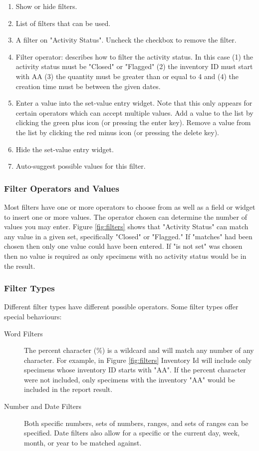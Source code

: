 \begin{enumerate}
  \item Show or hide filters.
  \item List of filters that can be used.
  \item A filter on "Activity Status". Uncheck the checkbox to remove the filter.
  \item Filter operator: describes how to filter the activity status. In this case (1) the activity status must be "Closed" or "Flagged" (2) the inventory ID must start with AA (3) the quantity must be greater than or equal to 4 and (4) the creation time must be between the given dates.
  \item Enter a value into the set-value entry widget. Note that this only appears for certain operators which can accept multiple values. Add a value to the list by clicking the green plus icon (or pressing the enter key). Remove a value from the list by clicking the red minus icon (or pressing the delete key).
  \item Hide the set-value entry widget.
  \item Auto-suggest possible values for this filter.
\end{enumerate}

\subsubsection{Filter Operators and Values}

Most filters have one or more operators to choose from as well as a field or widget to insert one or more values. The operator chosen can determine the number of values you may enter. Figure \ref{fig:filters} shows that "Activity Status" can match any value in a given set, specifically "Closed" or "Flagged." If "matches" had been chosen then only one value could have been entered. If "is not set" was chosen then no value is required as only specimens with no activity status would be in the result.

\subsubsection{Filter Types}

Different filter types have different possible operators. Some filter types offer special behaviours:

\begin{description}
  \item[Word Filters] The percent character (\%) is a wildcard and will match any number of any character. For example, in Figure \ref{fig:filters} Inventory Id will include only specimens whose inventory ID starts with "AA". If the percent character were not included, only specimens with the inventory "AA" would be included in the report result.
  \item[Number and Date Filters] Both specific numbers, sets of numbers, ranges, and sets of ranges can be specified. Date filters also allow for a specific or the current day, week, month, or year to be matched against.
\end{description}

